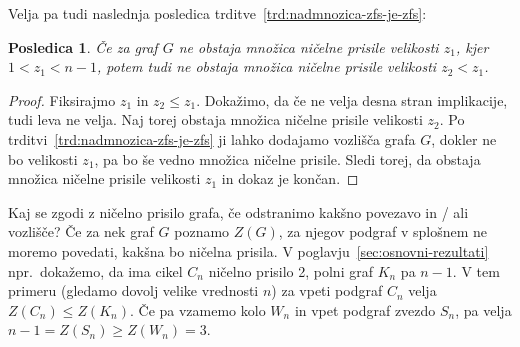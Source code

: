 \documentclass[12pt,a4paper,twoside]{article}
\theoremstyle{definition} %
\theoremstyle{plain} %
\newtheorem{posledica}[definicija]{Posledica}
\numberwithin{equation}{section}  %
\begin{document}
Velja pa tudi naslednja posledica trditve~\ref{trd:nadmnozica-zfs-je-zfs}:
\begin{posledica}
    \label{posl:ne-obstaja-manjsi-zfs}
    Če za graf $G$ ne obstaja množica ničelne prisile velikosti $z_1$, kjer $1 < z_1 < n-1$, potem tudi ne obstaja množica ničelne prisile velikosti $z_2 < z_1$.
\end{posledica}
\begin{proof}
    Fiksirajmo $z_1$ in $z_2 \leq z_1$. Dokažimo, da če ne velja desna stran implikacije, tudi leva ne velja. Naj torej obstaja množica ničelne prisile velikosti $z_2$. Po trditvi~\ref{trd:nadmnozica-zfs-je-zfs} ji lahko dodajamo vozlišča grafa $G$, dokler ne bo velikosti $z_1$, pa bo še vedno množica ničelne prisile. Sledi torej, da obstaja množica ničelne prisile velikosti $z_1$ in dokaz je končan. 
\end{proof}

Kaj se zgodi z ničelno prisilo grafa, če odstranimo kakšno povezavo in / ali vozlišče? Če za nek graf $G$ poznamo $Z(G)$, za njegov podgraf v splošnem ne moremo povedati, kakšna bo ničelna prisila. V poglavju~\ref{sec:osnovni-rezultati} npr.~dokažemo, da ima cikel $C_n$ ničelno prisilo 2, polni graf $K_n$ pa $n-1$. V tem primeru (gledamo dovolj velike vrednosti $n$) za vpeti podgraf $C_n$ velja $Z(C_n) \leq Z(K_n)$. Če pa vzamemo kolo $W_n$ in vpet podgraf zvezdo $S_n$, pa velja $n-1 = Z(S_n) \geq Z(W_n) = 3$.

\end{document}
